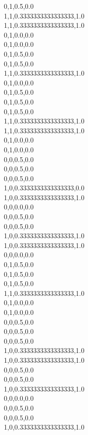 0,1,0.5,0.0\\
1,1,0.3333333333333333,1.0\\
1,1,0.3333333333333333,1.0\\
0,1,0.0,0.0\\
0,1,0.0,0.0\\
0,1,0.5,0.0\\
0,1,0.5,0.0\\
1,1,0.3333333333333333,1.0\\
0,1,0.0,0.0\\
0,1,0.5,0.0\\
0,1,0.5,0.0\\
0,1,0.5,0.0\\
1,1,0.3333333333333333,1.0\\
1,1,0.3333333333333333,1.0\\
0,1,0.0,0.0\\
0,1,0.0,0.0\\
0,0,0.5,0.0\\
0,0,0.5,0.0\\
0,0,0.5,0.0\\
1,0,0.3333333333333333,0.0\\
1,0,0.3333333333333333,1.0\\
0,0,0.0,0.0\\
0,0,0.5,0.0\\
0,0,0.5,0.0\\
1,0,0.3333333333333333,1.0\\
1,0,0.3333333333333333,1.0\\
0,0,0.0,0.0\\
0,1,0.5,0.0\\
0,1,0.5,0.0\\
0,1,0.5,0.0\\
1,1,0.3333333333333333,1.0\\
0,1,0.0,0.0\\
0,1,0.0,0.0\\
0,0,0.5,0.0\\
0,0,0.5,0.0\\
0,0,0.5,0.0\\
1,0,0.3333333333333333,1.0\\
1,0,0.3333333333333333,1.0\\
0,0,0.5,0.0\\
0,0,0.5,0.0\\
1,0,0.3333333333333333,1.0\\
0,0,0.0,0.0\\
0,0,0.5,0.0\\
0,0,0.5,0.0\\
1,0,0.3333333333333333,1.0\\

